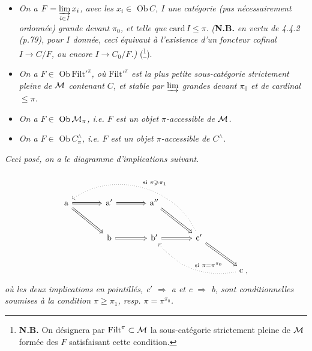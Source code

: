 \begin{itemize}[leftmargin=4em]
\item[\textit{b)}] \textit{On a $F = \varinjlim\limits_{i \in I} x_i$, avec les $x_i \in$} $\mathrm{Ob}\, C$\textit{, $I$ une catégorie (pas nécessairement ordonnée) grande devant $\pi_0$, et telle que} $\mathrm{card}\, I \leqslant \pi$. \textit{(}\textbf{N.B.} \textit{en vertu de 4.4.2 (p.79), pour $I$ donnée, ceci équivaut à l'existence d'un foncteur cofinal $I \longrightarrow C/F$, ou encore $I \longrightarrow C_0/F$.)} (\footnote[66]{\textbf{N.B.} On désignera par $\mathrm{Filt}^{\pi} \subset \mathcal{M}$ la sous-catégorie strictement pleine de $\mathcal{M}$ formée des $F$ satisfaisant cette condition.}).
\item[\textit{b$'$)}] \textit{On a $F \in$} $\mathrm{Ob}\,\mathrm{Filt}'^{\pi}$\textit{, où} $\mathrm{Filt}'^{\pi}$ \textit{est la plus petite sous-catégorie strictement pleine de $\mathcal{M}$ contenant $C$, et stable par $\varinjlim$ grandes devant $\pi_0$ et de cardinal $\leqslant \pi$.}
\item[\textit{c)}] \textit{On a $F \in$} $\mathrm{Ob}\,\mathcal{M}_{\pi}$\textit{, i.e. $F$ est un objet $\pi$-accessible de $\mathcal{M}$.}
\item[\textit{c$'$)}] \textit{On a $F \in$} $\mathrm{Ob}\, C^{\wedge}_{\pi}$\textit{, i.e. $F$ est un objet $\pi$-accessible de $C^{\wedge}$.}
\end{itemize}
\textit{Ceci posé, on a le diagramme d'implications suivant.}
\[
\begin{tikzcd}[column sep=large, row sep=large]
\mathrm{a} \arrow[r, Rightarrow] \arrow[dr, Rightarrow] & \mathrm{a}' \arrow[r, Rightarrow] & \mathrm{a}'' \arrow[dr, Rightarrow] & & \\
& \mathrm{b} \arrow[r, Rightarrow] & \mathrm{b}' \arrow[r, Rightarrow] & \mathrm{c}' \arrow[dr, Rightarrow] \arrow[ulll, dotted, bend right=50, "\text{si } \pi \geqslant \pi_1"'] & \\
& & & & \mathrm{c}\;, \arrow[ull, dotted, bend left=30, "\text{si } \pi = \pi^{\pi_0}"']
\end{tikzcd}
\]
\textit{où les deux implications en pointillés, c$'$ $\Longrightarrow$ a et c $\Longrightarrow$ b, sont conditionnelles soumises à la condition $\pi \geqslant \pi_1$, resp. $\pi = \pi^{\pi_0}$.}


